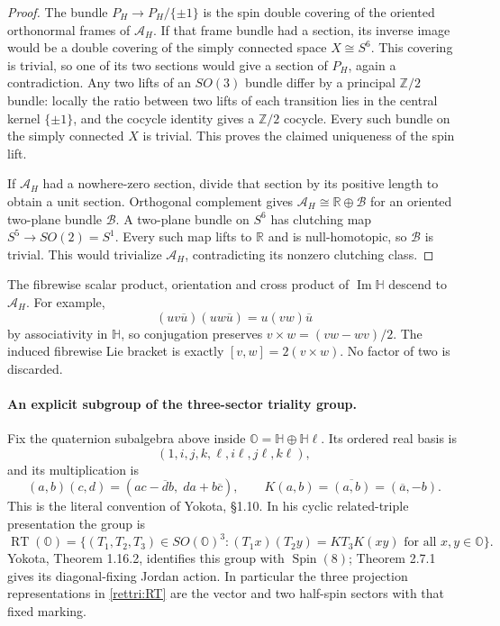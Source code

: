 \documentclass[11pt]{article}
\theoremstyle{definition}
\begin{document}
\begin{proof}
The bundle $P_H\to P_H/\{\pm1\}$ is the spin double covering of
the oriented orthonormal frames of $\mathcal A_H$. If that frame
bundle had a section, its inverse image would be a double covering
of the simply connected space $X\cong S^6$. This covering is
trivial, so one of its two sections would give a section of $P_H$,
again a contradiction. Any two lifts of an $SO(3)$ bundle differ
by a principal $\mathbb Z/2$ bundle: locally the ratio between two
lifts of each transition lies in the central kernel $\{\pm1\}$,
and the cocycle identity gives a $\mathbb Z/2$ cocycle. Every such
bundle on the simply connected $X$ is trivial. This proves the
claimed uniqueness of the spin lift.

If $\mathcal A_H$ had a nowhere-zero section, divide that section
by its positive length to obtain a unit section. Orthogonal
complement gives $\mathcal A_H\cong\mathbb R\oplus\mathcal B$
for an oriented two-plane bundle $\mathcal B$. A two-plane
bundle on $S^6$ has clutching map $S^5\to SO(2)=S^1$.
Every such map lifts to $\mathbb R$ and is null-homotopic, so
$\mathcal B$ is trivial. This would trivialize $\mathcal A_H$,
contradicting its nonzero clutching class.
\end{proof}

The fibrewise scalar product, orientation and cross product of
$\operatorname{Im}\mathbb H$ descend to $\mathcal A_H$.
For example,
\[
 (uv\overline u)(uw\overline u)=u(vw)\overline u
\]
by associativity in $\mathbb H$, so conjugation preserves
$v\times w=(vw-wv)/2$. The induced fibrewise Lie bracket is
exactly $[v,w]=2(v\times w)$. No factor of two is discarded.

\paragraph{An explicit subgroup of the three-sector triality group.}
Fix the quaternion subalgebra above inside
$\mathbb O=\mathbb H\oplus\mathbb H\ell$. Its ordered real basis is
\[
 (1,i,j,k,\ell,i\ell,j\ell,k\ell),
\]
and its multiplication is
\begin{equation}
 (a,b)(c,d)=(ac-\overline d b,\;da+b\overline c),\qquad
 K(a,b)=\overline{(a,b)}=(\overline a,-b).
 \label{rettri:CD}
\end{equation}
This is the literal convention of Yokota, \S1.10. In his cyclic
related-triple presentation the group is
\begin{equation}
 \operatorname{RT}(\mathbb O)=
 \{(T_1,T_2,T_3)\in SO(\mathbb O)^3:
       (T_1x)(T_2y)=K T_3 K(xy)\text{ for all }x,y\in\mathbb O\}.
 \label{rettri:RT}
\end{equation}
Yokota, Theorem 1.16.2, identifies this group with
$\operatorname{Spin}(8)$; Theorem 2.7.1 \cite{Yokota2009} gives its diagonal-fixing
Jordan action. In particular the three projection representations
in \eqref{rettri:RT} are the vector and two half-spin sectors
with that fixed marking.
\end{document}
